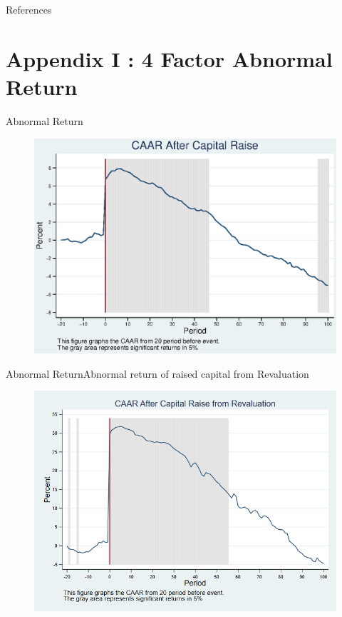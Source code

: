 \documentclass{beamer}
\begin{document}
%


	\tiny
\begin{frame}[allowframebreaks]{References}
	
	{		
		
		
	}
\end{frame}

\normalsize


\appendix






\section{Appendix I : 4 Factor Abnormal Return}
\begin{frame}{Abnormal Return}
\label{abreturn4Factor}
\begin{figure}
\centering
\includegraphics[width=0.7\linewidth]{AbReturn_4Factor.eps}
\label{fig:abreturn2}
\end{figure}
\hfill\hyperlink{abreturn}{}
\end{frame}

\begin{frame}{Abnormal Return}{Abnormal return of raised capital from Revaluation}
\label{abreturnrevalution4Factor}
\begin{figure}
\centering
\includegraphics[width=0.65\linewidth]{AbReturnRevalution_4Factor}
\label{fig:abreturnrevalution2}
\end{figure}

\hfill\hyperlink{abreturnrevalution}{}
\end{frame}
\end{document}
